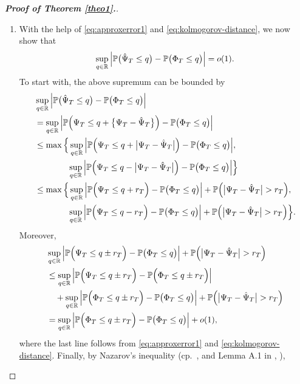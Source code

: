 \documentclass[a4paper,12pt]{article}
\numberwithin{equation}{section}
\begin{document}
\begin{proof}[\textnormal{\textbf{Proof of Theorem \ref{theo1}.}}]
\begin{enumerate}[label=\textit{Step \arabic*.}, leftmargin=0cm, itemindent=1.45cm]
\item With the help of \eqref{eq:approxerror1} and \eqref{eq:kolmogorov-distance}, we now show that 
\begin{equation}\label{eq:kolmogorov-distance-hat}
\sup_{q \in \mathbb{R}} \Big| \mathbb{P} \big( \hat{\Psi}_T \le q \big) - \mathbb{P} \big( \Phi_T \le q \big) \Big| = o(1).
\end{equation}
To start with, the above supremum can be bounded by 
\begin{align*}
 & \sup_{q \in \reals} \Big| \pr \big( \hat{\Psi}_T \le q \big) - \pr \big( \Phi_T \le q \big) \Big| \\
 & = \sup_{q \in \reals} \Big| \pr \Big( \Psi_T \le q + \big\{ \Psi_T - \hat{\Psi}_T \big\} \Big) - \pr \big( \Phi_T \le q \big) \Big| \\
 & \le \max \Big\{ \sup_{q \in \reals} \Big| \pr \Big( \Psi_T \le q + \big| \Psi_T - \hat{\Psi}_T \big| \Big) - \pr \big( \Phi_T \le q \big) \Big|, \\
 & \phantom{ \le \max \Big\{ \, } \sup_{q \in \reals} \Big| \pr \Big( \Psi_T \le q - \big| \Psi_T - \hat{\Psi}_T \big| \Big) - \pr \big( \Phi_T \le q \big) \Big| \Big\} \\
 & \le \max \Big\{ \sup_{q \in \reals} \Big| \pr \Big( \Psi_T \le q + r_T \Big) - \pr \big( \Phi_T \le q \big) \Big| +  \pr \Big( \big| \Psi_T - \hat{\Psi}_T \big| > r_T \Big), \\*
 & \phantom{ \le \max \Big\{ \, } \sup_{q \in \reals} \Big| \pr \Big( \Psi_T \le q - r_T \Big) - \pr \big( \Phi_T \le q \big) \Big| +  \pr \Big( \big| \Psi_T - \hat{\Psi}_T \big| > r_T \Big) \Big\}. 
\end{align*}
Moreover, 
\begin{align*}
 & \sup_{q \in \mathbb{R}} \Big| \mathbb{P} \Big( \Psi_T \le q \pm r_T \Big) - \mathbb{P} \big( \Phi_T \le q \big) \Big| +  \mathbb{P} \Big( \big| \Psi_T - \hat{\Psi}_T \big| > r_T \Big) \\
 & \le \sup_{q \in \mathbb{R}} \Big| \mathbb{P} \Big( \Psi_T \le q \pm r_T \Big) - \mathbb{P} \Big( \Phi_T \le q \pm r_T \Big) \Big| \\
 & \quad + \sup_{q \in \mathbb{R}} \Big| \mathbb{P} \Big( \Phi_T \le q \pm r_T \Big) - \mathbb{P} \big( \Phi_T \le q \big) \Big| + \mathbb{P} \Big( \big| \Psi_T - \hat{\Psi}_T \big| > r_T \Big) \\
 & = \sup_{q \in \mathbb{R}} \Big| \mathbb{P} \Big( \Phi_T \le q \pm r_T \Big) - \mathbb{P} \big( \Phi_T \le q \big) \Big| + o(1), 
\end{align*}
where the last line follows from \eqref{eq:approxerror1} and \eqref{eq:kolmogorov-distance}. Finally, by Nazarov's inequality (cp.\ \citeauthor{Nazarov2003}, \citeyear{Nazarov2003} and Lemma A.1 in \citeauthor{Chernozhukov2017}, \citeyear{Chernozhukov2017}),   

\end{enumerate}
\end{proof}
\end{document}

